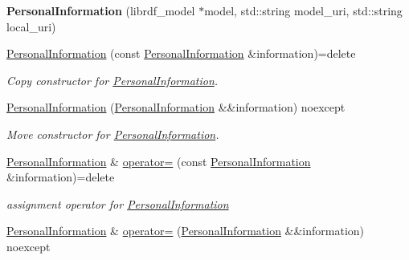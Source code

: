 \begin{DoxyCompactItemize}
\item 
\mbox{\label{classomexmeta_1_1PersonalInformation_a7494a26893d42e33953dee18bc6db4e4}} 
{\bfseries Personal\+Information} (librdf\+\_\+model $\ast$model, std\+::string model\+\_\+uri, std\+::string local\+\_\+uri)
\item 
\mbox{\label{classomexmeta_1_1PersonalInformation_a75cedb2a97efb996852b4e7cd39d6440}} 
\hyperlink{classomexmeta_1_1PersonalInformation_a75cedb2a97efb996852b4e7cd39d6440}{Personal\+Information} (const \hyperlink{classomexmeta_1_1PersonalInformation}{Personal\+Information} \&information)=delete
\begin{DoxyCompactList}\small\item\em Copy constructor for \hyperlink{classomexmeta_1_1PersonalInformation}{Personal\+Information}. \end{DoxyCompactList}\item 
\hyperlink{classomexmeta_1_1PersonalInformation_a6653d6c5751154f5f33562d9879d6727}{Personal\+Information} (\hyperlink{classomexmeta_1_1PersonalInformation}{Personal\+Information} \&\&information) noexcept
\begin{DoxyCompactList}\small\item\em Move constructor for \hyperlink{classomexmeta_1_1PersonalInformation}{Personal\+Information}. \end{DoxyCompactList}\item 
\mbox{\label{classomexmeta_1_1PersonalInformation_a11a759dd5f065ba6a48f0bc3b4c48438}} 
\hyperlink{classomexmeta_1_1PersonalInformation}{Personal\+Information} \& \hyperlink{classomexmeta_1_1PersonalInformation_a11a759dd5f065ba6a48f0bc3b4c48438}{operator=} (const \hyperlink{classomexmeta_1_1PersonalInformation}{Personal\+Information} \&information)=delete
\begin{DoxyCompactList}\small\item\em assignment operator for \hyperlink{classomexmeta_1_1PersonalInformation}{Personal\+Information} \end{DoxyCompactList}\item 
\hyperlink{classomexmeta_1_1PersonalInformation}{Personal\+Information} \& \hyperlink{classomexmeta_1_1PersonalInformation_a048a3377b27d4b87681e4f8c24dd8c4f}{operator=} (\hyperlink{classomexmeta_1_1PersonalInformation}{Personal\+Information} \&\&information) noexcept

\end{DoxyCompactItemize}
